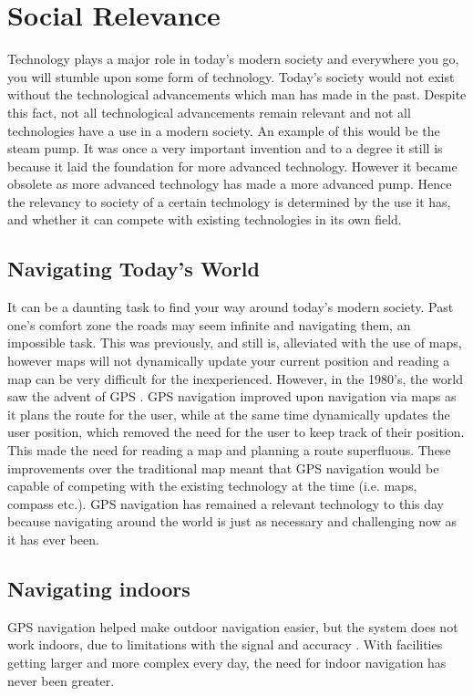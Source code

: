 \section{Social Relevance}


Technology plays a major role in today's modern society and everywhere you go, you will stumble upon some form of technology. Today's society would not exist without the technological advancements which man has made in the past. Despite this fact, not all technological advancements remain relevant and not all technologies have a use in a modern society. An example of this would be the steam pump. It was once a very important invention and to a degree it still is because it laid the foundation for more advanced technology. However it became obsolete as more advanced technology has made a more advanced pump. Hence the relevancy to society of a certain technology is determined by the use it has, and whether it can compete with existing technologies in its own field.

\subsection{Navigating Today's World}
It can be a daunting task to find your way around today's modern society. Past one's comfort zone the roads may seem infinite and navigating them, an impossible task. This was previously, and still is, alleviated with the use of maps, however maps will not dynamically update your current position and reading a map can be very difficult for the inexperienced. However, in the 1980's, the world saw the advent of GPS \cite{gps_advent}. GPS navigation improved upon navigation via maps as it plans the route for the user, while at the same time dynamically updates the user position, which removed the need for the user to keep track of their position. This made the need for reading a map and planning a route superfluous. These improvements over the traditional map meant that GPS navigation would be capable of competing with the existing technology at the time (i.e. maps, compass etc.). GPS navigation has remained a relevant technology to this day because navigating around the world is just as necessary and challenging now as it has ever been.

\subsection{Navigating indoors}
GPS navigation helped make outdoor navigation easier, but the system does not work indoors, due to limitations with the signal and accuracy \cite{gps_tech}. With facilities getting larger and more complex every day, the need for indoor navigation has never been greater.

